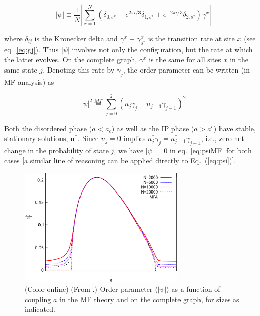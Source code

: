 \begin{equation}
    \label{eq:psi}
    |\psi| \equiv \frac{1}{N}\left| \sum_{x=1}^N \left( \delta_{0,s^x} + e^{2\pi i/3}\delta_{1,s^x} + e^{-2\pi i/3}\delta_{2,s^x} \right) \gamma^x \right|
\end{equation}
\vspace{1em}

\noindent where $\delta_{ij}$ is the Kronecker delta and $\gamma^x \equiv \gamma^x_{s^x}$ is the transition rate at site $x$ (see
eq.~\ref{eq:gj}). Thus $|\psi|$ involves not only the configuration, but the rate at which the latter evolves.  On the complete graph,
$\gamma^x$ is the same for all sites $x$ in the same state $j$. Denoting this rate by $\gamma_j$, the order parameter can be written
(in MF analysis) as

\begin{equation}
    \label{eq:psiMF}
    |\psi|^2 \stackrel{MF}{=} \sum_{j=0}^2 (n_j \gamma_j - n_{j-1} \gamma_{j-1})^2 
\end{equation}

\noindent Both the disordered phase ($a< a_c$) as well as the IP phase ($a>a^c$) have stable, stationary solutions, $\textbf{n}^*$.
Since $\dot{n}_j = 0$ implies $n^*_j\gamma_j = n^*_{j-1}\gamma_{j-1}$, i.e., zero net change in the probability of state $j$, we have
$|\psi|=0$ in eq.~\ref{eq:psiMF} for both cases [a similar line of reasoning can be applied directly to Eq.~(\ref{eq:psi})].

\begin{figure}
\begin{center}
    \includegraphics[width=0.7\textwidth]{fig/chap2/psivsa.eps}
    \caption{\label{fig:psi}
        (Color online) (From \cite{assis2011infinite}.) Order parameter $\langle
        |\psi| \rangle$ as a function of coupling $a$ in the MF theory and
        on the complete graph, for sizes as indicated.
    }
\end{center}
\end{figure}

